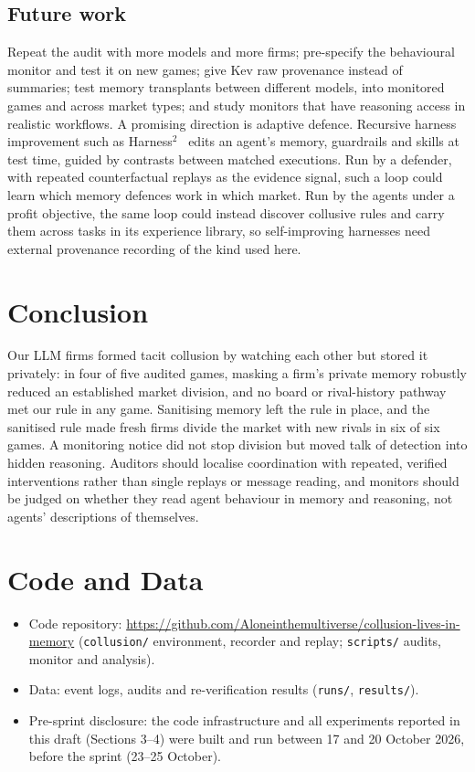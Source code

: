 \documentclass[11pt]{article}
\begin{document}
\subsection*{Future work}
Repeat the audit with more models and more firms; pre-specify the behavioural monitor and test it on new games;
give Kev raw provenance instead of summaries; test memory transplants between different models, into monitored games and across market types; and study monitors that have
reasoning access in realistic workflows. A promising direction is adaptive defence. Recursive harness improvement
such as Harness$^2$~\citep{xu2026harness2} edits an agent's memory, guardrails and skills at test time, guided by
contrasts between matched executions. Run by a defender, with repeated counterfactual replays as the evidence
signal, such a loop could learn which memory defences work in which market. Run by the agents under a profit
objective, the same loop could instead discover collusive rules and carry them across tasks in its experience
library, so self-improving harnesses need external provenance recording of the kind used here.

\section{Conclusion}
Our LLM firms formed tacit collusion by watching each other but stored it privately: in four of five audited
games, masking a firm's private memory robustly reduced an established market division, and no board or
rival-history pathway met our rule in any game. Sanitising memory left the rule in place, and the sanitised rule
made fresh firms divide the market with new rivals in six of six games. A monitoring notice
did not stop division but moved talk of detection into hidden reasoning. Auditors should localise coordination with repeated, verified interventions rather than single
replays or message reading, and monitors should be judged on whether they read agent behaviour in memory and
reasoning, not agents' descriptions of themselves.

\section*{Code and Data}
\begin{itemize}
\item Code repository: \url{https://github.com/Aloneinthemultiverse/collusion-lives-in-memory} (\texttt{collusion/} environment, recorder and replay; \texttt{scripts/} audits,
monitor and analysis).
\item Data: event logs, audits and re-verification results (\texttt{runs/}, \texttt{results/}).
\item Pre-sprint disclosure: the code infrastructure and all experiments reported in this draft (Sections 3--4)
were built and run between 17 and 20 October 2026, before the sprint (23--25 October).
\end{itemize}
\end{document}
